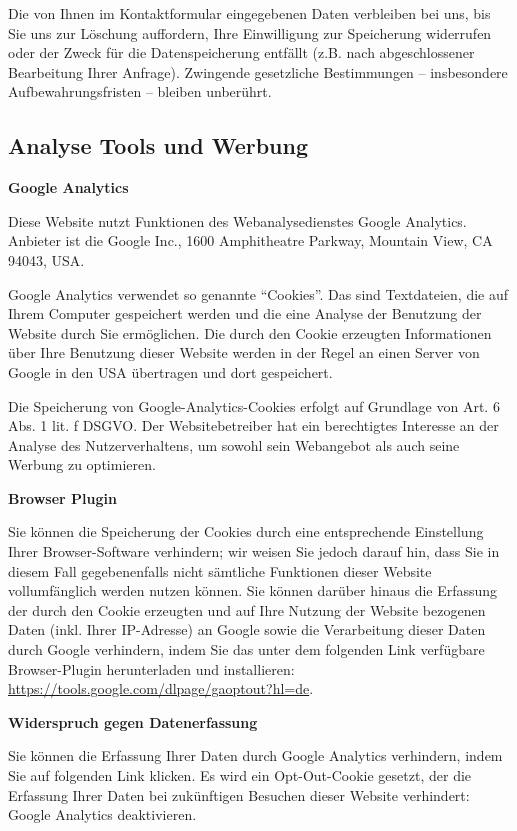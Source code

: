 \documentclass[12pt,a4paper]{scrartcl}
\begin{document}
Die von Ihnen im Kontaktformular eingegebenen Daten verbleiben bei uns,
bis Sie uns zur Löschung auffordern, Ihre Einwilligung zur Speicherung
widerrufen oder der Zweck für die Datenspeicherung entfällt (z.B. nach
abgeschlossener Bearbeitung Ihrer Anfrage). Zwingende gesetzliche
Bestimmungen -- insbesondere Aufbewahrungsfristen -- bleiben unberührt.

\hypertarget{analyse-tools-und-werbung}{%
\subsection{Analyse Tools und Werbung}\label{analyse-tools-und-werbung}}

\textbf{Google Analytics}

Diese Website nutzt Funktionen des Webanalysedienstes Google Analytics.
Anbieter ist die Google Inc., 1600 Amphitheatre Parkway, Mountain View,
CA 94043, USA.

Google Analytics verwendet so genannte ``Cookies''. Das sind
Textdateien, die auf Ihrem Computer gespeichert werden und die eine
Analyse der Benutzung der Website durch Sie ermöglichen. Die durch den
Cookie erzeugten Informationen über Ihre Benutzung dieser Website werden
in der Regel an einen Server von Google in den USA übertragen und dort
gespeichert.

Die Speicherung von Google-Analytics-Cookies erfolgt auf Grundlage von
Art. 6 Abs. 1 lit. f DSGVO. Der Websitebetreiber hat ein berechtigtes
Interesse an der Analyse des Nutzerverhaltens, um sowohl sein Webangebot
als auch seine Werbung zu optimieren.

\textbf{Browser Plugin}

Sie können die Speicherung der Cookies durch eine entsprechende
Einstellung Ihrer Browser-Software verhindern; wir weisen Sie jedoch
darauf hin, dass Sie in diesem Fall gegebenenfalls nicht sämtliche
Funktionen dieser Website vollumfänglich werden nutzen können. Sie
können darüber hinaus die Erfassung der durch den Cookie erzeugten und
auf Ihre Nutzung der Website bezogenen Daten (inkl. Ihrer IP-Adresse) an
Google sowie die Verarbeitung dieser Daten durch Google verhindern,
indem Sie das unter dem folgenden Link verfügbare Browser-Plugin
herunterladen und installieren:
\url{https://tools.google.com/dlpage/gaoptout?hl=de}.

\textbf{Widerspruch gegen Datenerfassung}

Sie können die Erfassung Ihrer Daten durch Google Analytics verhindern,
indem Sie auf folgenden Link klicken. Es wird ein Opt-Out-Cookie
gesetzt, der die Erfassung Ihrer Daten bei zukünftigen Besuchen dieser
Website verhindert: Google Analytics deaktivieren.
\end{document}
